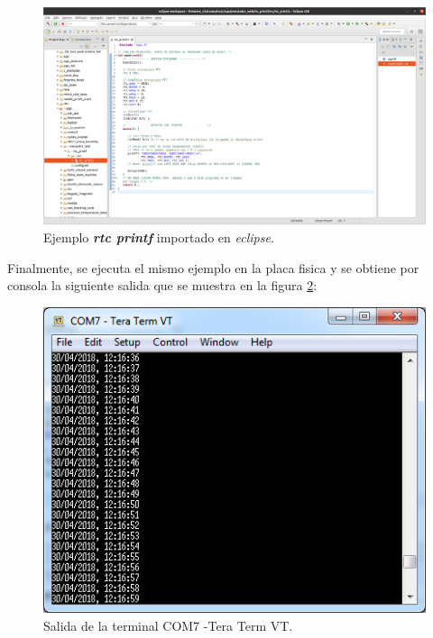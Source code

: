 \begin{figure}[ht]
	\centering
	\includegraphics[scale=.20]{./Figures/rtcprintfEclipse.png}
	\caption{Ejemplo \textit{\textbf{rtc printf}} importado en \textit{eclipse}.}
	\label{fig:rtcprintfEclipse}
\end{figure}

\hfill \break
\hfill \break
\hfill \break
\hfill \break
\hfill \break
\hfill \break
\hfill \break
\hfill \break


Finalmente, se ejecuta el mismo ejemplo en la placa fisica y se obtiene por consola la siguiente salida que se muestra en la figura \ref{fig:rtcprintfPlaca}:

\begin{figure}[ht]
	\centering
	\includegraphics[scale=.90]{./Figures/rtcprintfPlaca.png}
	\caption{Salida de la terminal COM7 -Tera Term VT.}
	\label{fig:rtcprintfPlaca}
\end{figure}



